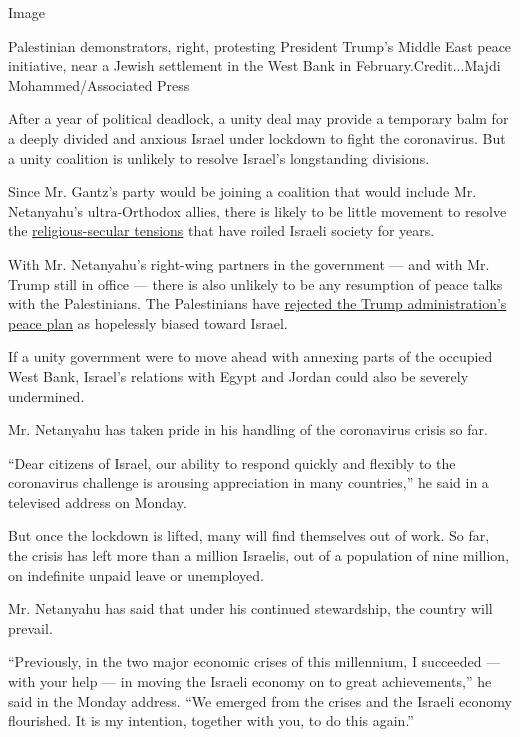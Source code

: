 Image

Palestinian demonstrators, right, protesting President Trump's Middle
East peace initiative, near a Jewish settlement in the West Bank in
February.Credit...Majdi Mohammed/Associated Press

After a year of political deadlock, a unity deal may provide a temporary
balm for a deeply divided and anxious Israel under lockdown to fight the
coronavirus. But a unity coalition is unlikely to resolve Israel's
longstanding divisions.

Since Mr. Gantz's party would be joining a coalition that would include
Mr. Netanyahu's ultra-Orthodox allies, there is likely to be little
movement to resolve the
\href{https://www.nytimes3xbfgragh.onion/2019/09/12/world/middleeast/israeli-election-religious-secular.html?searchResultPosition=4}{religious-secular
tensions} that have roiled Israeli society for years.

With Mr. Netanyahu's right-wing partners in the government --- and with
Mr. Trump still in office --- there is also unlikely to be any
resumption of peace talks with the Palestinians. The Palestinians have
\href{https://www.nytimes3xbfgragh.onion/2020/02/11/world/middleeast/palestinian-trump-plan-UN.html}{rejected
the Trump administration's peace plan} as hopelessly biased toward
Israel.

If a unity government were to move ahead with annexing parts of the
occupied West Bank, Israel's relations with Egypt and Jordan could also
be severely undermined.

Mr. Netanyahu has taken pride in his handling of the coronavirus crisis
so far.

``Dear citizens of Israel, our ability to respond quickly and flexibly
to the coronavirus challenge is arousing appreciation in many
countries,'' he said in a televised address on Monday.

But once the lockdown is lifted, many will find themselves out of work.
So far, the crisis has left more than a million Israelis, out of a
population of nine million, on indefinite unpaid leave or unemployed.

Mr. Netanyahu has said that under his continued stewardship, the country
will prevail.

``Previously, in the two major economic crises of this millennium, I
succeeded --- with your help --- in moving the Israeli economy on to
great achievements,'' he said in the Monday address. ``We emerged from
the crises and the Israeli economy flourished. It is my intention,
together with you, to do this again.''


